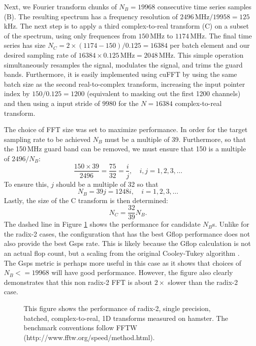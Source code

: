 \documentclass[11pt,preprint]{aastex}
\begin{document}
Next, we Fourier transform chunks of $N_B = 19968$ consecutive time series samples (B).  The resulting 
spectrum has a frequency resolution of $2496$\,MHz$/19958=125$\,kHz.  The next step is to apply a third
complex-to-real transform (C) on a subset of the spectrum, using only frequences from $150$\,MHz to $1174$\,MHz.  
The final time series has size $N_C= 2\times(1174-150)/0.125=16384$ per batch element and our desired 
sampling rate of 
$16384 \times 0.125$\,MHz$ = 2048$\,MHz.  This simple operation simultaneously resamples the signal, modulates 
the signal, and trims the guard bands.  Furthermore, it is easily implemented using cuFFT by using the same 
batch size as the second real-to-complex transform, increasing the input pointer index by $150 / 0.125 = 1200$
(equivalent to masking out the first 1200 channels) and then using a input stride of $9980$ for the 
$N=16384$ complex-to-real transform.

The choice of FFT size was set to maximize performance.  In order for the target sampling rate to be achieved
$N_B$ must be a multiple of 39.  Furthermore, so that the 150\,MHz guard band can be removed, we must ensure that 
150 is a multiple of $2496/N_B$:
\begin{equation}
\frac{150\times39}{2496} = \frac{75}{32} = \frac{i}{j}, \quad i,j = 1, 2,3, \ldots
\end{equation}
To ensure this, $j$ should be a multiple of 32 so that 
\begin{equation}
N_B = 39j = 1248i, \quad i=1,2,3,\ldots
\end{equation}
Lastly, the size of the C transform is then determined:
\begin{equation}
N_C = \frac{32}{39} N_B.
\end{equation}
The dashed line in Figure \ref{fig:C2R_performance} shows the performance for candidate $N_B$s.  Unlike for 
the radix-2 cases, the configuration that has the best Gflop performance does not also provide the best Gsps
rate.  This is likely because the Gflop calculation is not an actual flop count, but a scaling from the 
original Cooley-Tukey algorithm \citep{cooley59}.  The Gsps metric is perhaps more useful in this case as it
shows that choices of $N_B <= 19968$ will have good performance.  However, the figure also clearly demonstrates
that this non radix-2 FFT is about $2\times$ slower than the radix-2 case.


\begin{figure}[H!]
\caption{This figure shows the performance of radix-2, single precision, batched, complex-to-real, 1D transforms 
measured on hamster. The benchmark conventions follow FFTW  (http://www.fftw.org/speed/method.html).}
\label{fig:C2R_performance}
\end{figure}
\end{document}

